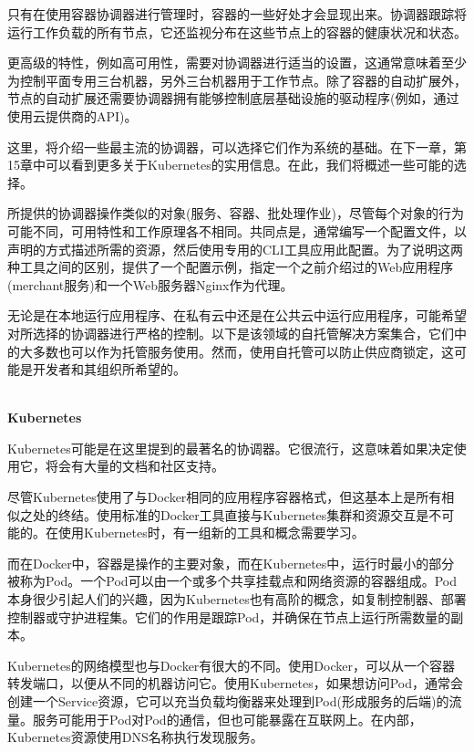 
只有在使用容器协调器进行管理时，容器的一些好处才会显现出来。协调器跟踪将运行工作负载的所有节点，它还监视分布在这些节点上的容器的健康状况和状态。

更高级的特性，例如高可用性，需要对协调器进行适当的设置，这通常意味着至少为控制平面专用三台机器，另外三台机器用于工作节点。除了容器的自动扩展外，节点的自动扩展还需要协调器拥有能够控制底层基础设施的驱动程序(例如，通过使用云提供商的API)。

这里，将介绍一些最主流的协调器，可以选择它们作为系统的基础。在下一章，第15章中可以看到更多关于Kubernetes的实用信息。在此，我们将概述一些可能的选择。

所提供的协调器操作类似的对象(服务、容器、批处理作业)，尽管每个对象的行为可能不同，可用特性和工作原理各不相同。共同点是，通常编写一个配置文件，以声明的方式描述所需的资源，然后使用专用的CLI工具应用此配置。为了说明这两种工具之间的区别，提供了一个配置示例，指定一个之前介绍过的Web应用程序(merchant服务)和一个Web服务器Nginx作为代理。


无论是在本地运行应用程序、在私有云中还是在公共云中运行应用程序，可能希望对所选择的协调器进行严格的控制。以下是该领域的自托管解决方案集合，它们中的大多数也可以作为托管服务使用。然而，使用自托管可以防止供应商锁定，这可能是开发者和其组织所希望的。

\hspace*{\fill} \\ %
\noindent
\textbf{Kubernetes}

Kubernetes可能是在这里提到的最著名的协调器。它很流行，这意味着如果决定使用它，将会有大量的文档和社区支持。

尽管Kubernetes使用了与Docker相同的应用程序容器格式，但这基本上是所有相似之处的终结。使用标准的Docker工具直接与Kubernetes集群和资源交互是不可能的。在使用Kubernetes时，有一组新的工具和概念需要学习。

而在Docker中，容器是操作的主要对象，而在Kubernetes中，运行时最小的部分被称为Pod。一个Pod可以由一个或多个共享挂载点和网络资源的容器组成。Pod本身很少引起人们的兴趣，因为Kubernetes也有高阶的概念，如复制控制器、部署控制器或守护进程集。它们的作用是跟踪Pod，并确保在节点上运行所需数量的副本。

Kubernetes的网络模型也与Docker有很大的不同。使用Docker，可以从一个容器转发端口，以便从不同的机器访问它。使用Kubernetes，如果想访问Pod，通常会创建一个Service资源，它可以充当负载均衡器来处理到Pod(形成服务的后端)的流量。服务可能用于Pod对Pod的通信，但也可能暴露在互联网上。在内部，Kubernetes资源使用DNS名称执行发现服务。


